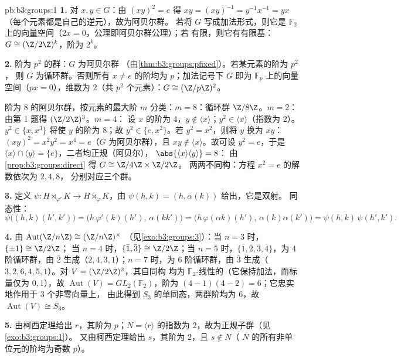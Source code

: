 \begin{solution}{pb:b3:groups:1}
\textbf{1.} 对 $x, y \in G$：由 $(xy)^2 = e$ 得 $xy = (xy)^{-1} =
y^{-1}x^{-1} = yx$（每个元素都是自己的逆元），故为阿贝尔群。
若将 $G$ 写成加法形式，则它是 $\mathbb
F_2$ 上的向量空间（$2x = 0$，公理即阿贝尔群公理）；若
有限，则它有有限基：$G \cong (\Z/2\Z)^k$，阶为
$2^k$。

\textbf{2.} 阶为 $p^2$ 的群：$G$ 为阿贝尔群
（由\cref{thm:b3:groups:pfixed}）。若某元素的阶为 $p^2$，
则 $G$ 为循环群。否则所有 $x \neq e$ 的阶均为 $p$；加法记号下
$G$ 即为 $\mathbb F_p$ 上的向量空间（$px = 0$），维数为
$2$（共 $p^2$ 个元素）：$G \cong (\Z/p\Z)^2$。

阶为 $8$ 的阿贝尔群，按元素的最大阶 $m$ 分类：$m =
8$：循环群 $\Z/8\Z$。$m = 2$：由第 1 题得 $(\Z/2\Z)^3$。$m = 4$：
设 $x$ 的阶为 $4$，$y \notin \langle x \rangle$；$y^2 \in
\langle x\rangle$（指数为 $2$）。$y^2 \in \{x, x^3\}$ 将使 $y$
的阶为 $8$；故 $y^2 \in \{e, x^2\}$。若 $y^2 = x^2$，则将 $y$ 换为
$xy$：$(xy)^2 = x^2y^2 = x^4 = e$（$G$ 为阿贝尔群），且 $xy \notin
\langle x\rangle$。故可设 $y^2 = e$，于是 $\langle x
\rangle \cap \langle y \rangle = \{e\}$，二者均正规（阿贝尔），
$\abs{\langle x\rangle \langle y\rangle} = 8$：
由\cref{prop:b3:groups:direct} 得 $G \cong \Z/4\Z \times \Z/2\Z$。
两两不同构：方程 $x^2 = e$ 的解数依次为 $2, 4, 8$，
分别对应三个群。

\textbf{3.} 定义 $\psi \colon H \rtimes_{\varphi'} K \to H
\rtimes_{\varphi} K$，由 $\psi(h, k) = (h, \alpha(k))$ 给出，它是双射。
同态性：
\[
\psi\bigl((h,k)(h',k')\bigr)
= \bigl(h\,\varphi'(k)(h'),\, \alpha(kk')\bigr)
= \bigl(h\,\varphi(\alpha k)(h'),\, \alpha(k)\alpha(k')\bigr)
= \psi(h,k)\,\psi(h',k').
\]

\textbf{4.} 由 $\operatorname{Aut}(\Z/n\Z) \cong (\Z/n\Z)^\times$
（见\cref{exo:b3:groups:3}）：当 $n = 3$ 时，$\{\pm 1\} \cong \Z/2\Z$；
当 $n = 4$ 时，$\{\bar 1, \bar 3\} \cong \Z/2\Z$；当 $n = 5$ 时，$\{\bar 1,
\bar 2, \bar 3, \bar 4\}$，为 $4$ 阶循环群，由 $\bar
2$ 生成（$2, 4, 3, 1$）；$n = 7$ 时，为 $6$ 阶循环群，由 $\bar
3$ 生成（$3, 2, 6, 4, 5, 1$）。对 $V = (\Z/2\Z)^2$，其自同构
均为 $\mathbb F_2$-线性的（它保持加法，而标量仅为 $0,
1$），故 $\operatorname{Aut}(V) = GL_2(\mathbb F_2)$，阶为
$(4-1)(4-2) = 6$；它忠实地作用于 $3$ 个非零向量上，
由此得到 $S_3$ 的单同态，两群阶均为
$6$，故 $\operatorname{Aut}(V) \cong S_3$。

\textbf{5.} 由柯西定理给出 $r$，其阶为 $p$；$N = \langle r
\rangle$ 的指数为 $2$，故为正规子群（见\cref{exo:b3:groups:1}）。
又由柯西定理给出 $s$，其阶为 $2$，且 $s \notin N$（
$N$ 的所有非单位元的阶均为奇数 $p$）。


\end{solution}
